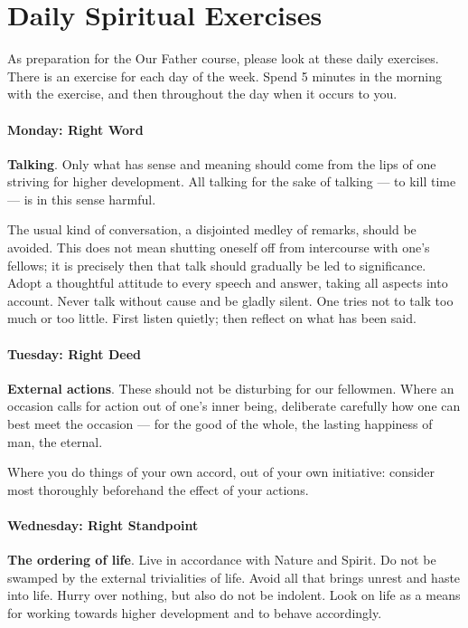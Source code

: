 \section{Daily Spiritual Exercises}

As preparation for the Our Father course, please look at these daily exercises. There is an exercise for each day of the week. Spend 5 minutes in the morning with the exercise, and then throughout the day when it occurs to you.

\paragraph{Monday: Right Word}
\textbf{Talking}. Only what has sense and meaning should come from the lips of one striving for higher development. All talking for the sake of talking — to kill time — is in this sense harmful.

The usual kind of conversation, a disjointed medley of remarks, should be avoided. This does not mean shutting oneself off from intercourse with one's fellows; it is precisely then that talk should gradually be led to significance. Adopt a thoughtful attitude to every speech and answer, taking all aspects into account. Never talk without cause and be gladly silent. One tries not to talk too much or too little. First listen quietly; then reflect on what has been said.

\paragraph{Tuesday: Right Deed}
\textbf{External actions}. These should not be disturbing for our fellowmen. Where an occasion calls for action out of one's inner being, deliberate carefully how one can best meet the occasion — for the good of the whole, the lasting happiness of man, the eternal.

Where you do things of your own accord, out of your own initiative: consider most thoroughly beforehand the effect of your actions.

\paragraph{Wednesday: Right Standpoint}
\textbf{The ordering of life}. Live in accordance with Nature and Spirit. Do not be swamped by the external trivialities of life. Avoid all that brings unrest and haste into life. Hurry over nothing, but also do not be indolent. Look on life as a means for working towards higher development and to behave accordingly.

